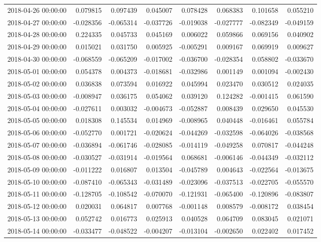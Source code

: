 \begin{tabular}{lrrrrrrr}
2018-04-26 00:00:00 & 0.079815 & 0.097439 & 0.045007 & 0.078428 & 0.068383 & 0.101658 & 0.055210 \\
2018-04-27 00:00:00 & -0.028356 & -0.065314 & -0.037726 & -0.019038 & -0.027777 & -0.082349 & -0.049159 \\
2018-04-28 00:00:00 & 0.224335 & 0.045733 & 0.045169 & 0.006022 & 0.059866 & 0.069156 & 0.040902 \\
2018-04-29 00:00:00 & 0.015021 & 0.031750 & 0.005925 & -0.005291 & 0.009167 & 0.069919 & 0.009627 \\
2018-04-30 00:00:00 & -0.068559 & -0.065209 & -0.017002 & -0.036700 & -0.028354 & 0.058802 & -0.033670 \\
2018-05-01 00:00:00 & 0.054378 & 0.004373 & -0.018681 & -0.032986 & 0.001149 & 0.001094 & -0.002430 \\
2018-05-02 00:00:00 & 0.036838 & 0.073594 & 0.016922 & 0.045994 & 0.023470 & 0.030512 & 0.024035 \\
2018-05-03 00:00:00 & -0.008947 & 0.036175 & 0.054062 & 0.039120 & 0.124282 & -0.001415 & 0.061590 \\
2018-05-04 00:00:00 & -0.027611 & 0.003032 & -0.004673 & -0.052887 & 0.008439 & 0.029650 & 0.045530 \\
2018-05-05 00:00:00 & 0.018308 & 0.145534 & 0.014969 & -0.008965 & 0.040448 & -0.016461 & 0.055784 \\
2018-05-06 00:00:00 & -0.052770 & 0.001721 & -0.020624 & -0.044269 & -0.032598 & -0.064026 & -0.038568 \\
2018-05-07 00:00:00 & -0.036894 & -0.061746 & -0.028085 & -0.014119 & -0.049258 & 0.070817 & -0.044248 \\
2018-05-08 00:00:00 & -0.030527 & -0.031914 & -0.019564 & 0.068681 & -0.006146 & -0.044349 & -0.032112 \\
2018-05-09 00:00:00 & -0.011222 & 0.016807 & 0.013504 & -0.045789 & 0.004643 & -0.022564 & -0.013675 \\
2018-05-10 00:00:00 & -0.087410 & -0.065343 & -0.031489 & -0.023096 & -0.037513 & -0.022705 & -0.055570 \\
2018-05-11 00:00:00 & -0.128705 & -0.108542 & -0.070070 & -0.121931 & -0.065400 & -0.120896 & -0.083807 \\
2018-05-12 00:00:00 & 0.020031 & 0.064817 & 0.007768 & -0.001148 & 0.008579 & -0.008172 & 0.038454 \\
2018-05-13 00:00:00 & 0.052742 & 0.016773 & 0.025913 & 0.040528 & 0.064709 & 0.083045 & 0.021071 \\
2018-05-14 00:00:00 & -0.033477 & -0.048522 & -0.004207 & -0.013104 & -0.002650 & 0.022402 & 0.017452 \\

\end{tabular}
